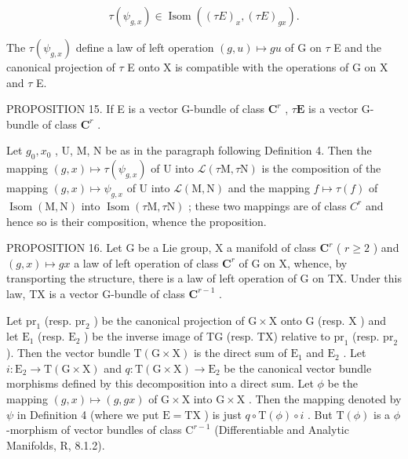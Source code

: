 \[
\tau (\psi_ {g, x}) \in \operatorname{Isom} ((\tau E) _ {x}, (\tau E) _ {g x}).
\]

The \(\tau(\psi_{g,x})\) define a law of left operation \((g,u)\mapsto gu\) of G on \(\tau\) E and the canonical projection of \(\tau\) E onto X is compatible with the operations of G on X and \(\tau\) E.

PROPOSITION 15. If E is a vector G-bundle of class \(\mathbf{C}^r\) , \(\tau \mathbf{E}\) is a vector G-bundle of class \(\mathbf{C}^r\) .

Let \(g_0, x_0\) , U, M, N be as in the paragraph following Definition 4. Then the mapping \((g, x) \mapsto \tau(\psi_{g,x})\) of U into \(\mathcal{L}(\tau\mathrm{M}, \tau\mathrm{N})\) is the composition of the mapping \((g, x) \mapsto \psi_{g,x}\) of U into \(\mathcal{L}(\mathrm{M}, \mathrm{N})\) and the mapping \(f \mapsto \tau(f)\) of \(\operatorname{Isom}(\mathrm{M}, \mathrm{N})\) into \(\operatorname{Isom}(\tau\mathrm{M}, \tau\mathrm{N})\) ; these two mappings are of class \(C^r\) and hence so is their composition, whence the proposition.

PROPOSITION 16. Let G be a Lie group, X a manifold of class \(\mathbf{C}^r\) ( \(r \geqslant 2\) ) and \((g, x) \mapsto gx\) a law of left operation of class \(\mathbf{C}^r\) of G on X, whence, by transporting the structure, there is a law of left operation of G on TX. Under this law, TX is a vector G-bundle of class \(\mathbf{C}^{r-1}\) .

Let \(\mathrm{pr}_1\) (resp. \(\mathrm{pr}_2\) ) be the canonical projection of \(\mathrm{G} \times \mathrm{X}\) onto \(\mathrm{G}\) (resp. \(\mathrm{X}\) ) and let \(\mathrm{E}_1\) (resp. \(\mathrm{E}_2\) ) be the inverse image of TG (resp. TX) relative to \(\mathrm{pr}_1\) (resp. \(\mathrm{pr}_2\) ). Then the vector bundle \(\mathrm{T}(\mathrm{G} \times \mathrm{X})\) is the direct sum of \(\mathrm{E}_1\) and \(\mathrm{E}_2\) . Let \(i: \mathrm{E}_2 \to \mathrm{T}(\mathrm{G} \times \mathrm{X})\) and \(q: \mathrm{T}(\mathrm{G} \times \mathrm{X}) \to \mathrm{E}_2\) be the canonical vector bundle morphisms defined by this decomposition into a direct sum. Let \(\phi\) be the mapping \((g, x) \mapsto (g, gx)\) of \(\mathrm{G} \times \mathrm{X}\) into \(\mathrm{G} \times \mathrm{X}\) . Then the mapping denoted by \(\psi\) in Definition 4 (where we put \(\mathrm{E} = \mathrm{TX}\) ) is just \(q \circ \mathrm{T}(\phi) \circ i\) . But \(\mathrm{T}(\phi)\) is a \(\phi\) -morphism of vector bundles of class \(\mathrm{C}^{r-1}\) (Differentiable and Analytic Manifolds, R, 8.1.2).

